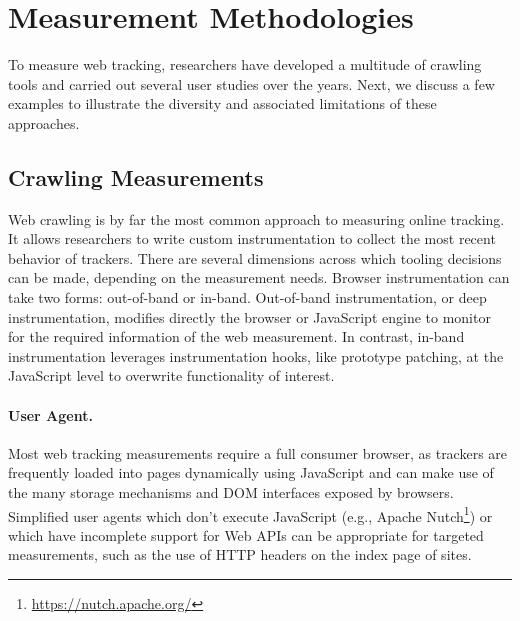 \section{Measurement Methodologies}
\label{sec:measurement-methodologies}

To measure web tracking, researchers have developed a multitude of crawling tools and carried out several user studies over the years. Next, we discuss a few examples to illustrate the diversity and associated limitations of these approaches.


\subsection{Crawling Measurements}
\label{sec:crawling}

Web crawling is by far the most common approach to measuring online tracking. It allows researchers to write custom instrumentation to collect the most recent behavior of trackers. There are several dimensions across which tooling decisions can be made, depending on the measurement needs. Browser instrumentation can take two forms: out-of-band or in-band. Out-of-band instrumentation, or deep instrumentation, modifies directly the browser or JavaScript engine to monitor for the required information of the web measurement. In contrast, in-band instrumentation leverages instrumentation hooks, like prototype patching, at the JavaScript level to overwrite functionality of interest. 

\paragraph{User Agent.} Most web tracking measurements require a full consumer browser, as trackers are frequently loaded into pages dynamically using JavaScript and can make use of the many storage mechanisms and DOM interfaces exposed by browsers. Simplified user agents which don't execute JavaScript (e.g., Apache Nutch\footnote{\url{https://nutch.apache.org/}}) or which have incomplete support for Web APIs can be appropriate for targeted measurements, such as the use of HTTP headers on the index page of sites. 

